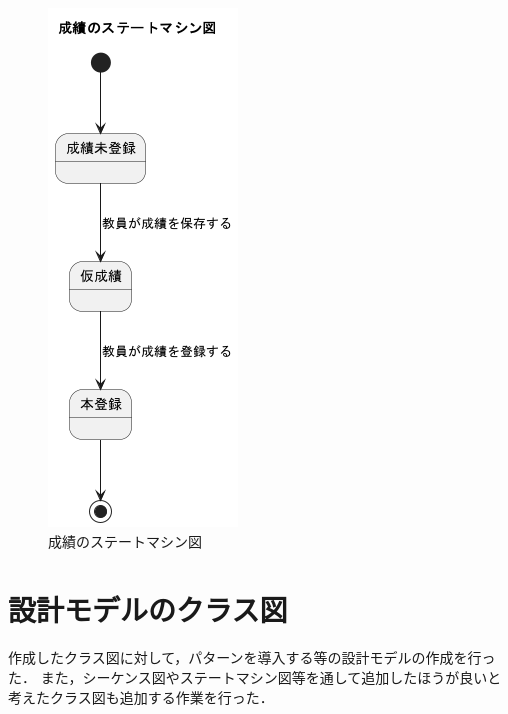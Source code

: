 \documentclass[documentclass]{jsarticle}
\begin{document}
\begin{figure}[H]
  \begin{center}
    \includegraphics*[scale=0.6]{figure/8-1.png}
  \end{center}
  \caption{成績のステートマシン図}
  \label{fig:8-1}
\end{figure}

\newpage

\section{設計モデルのクラス図}
作成したクラス図に対して，パターンを導入する等の設計モデルの作成を行った．
また，シーケンス図やステートマシン図等を通して追加したほうが良いと考えたクラス図も追加する作業を行った．
\end{document}
